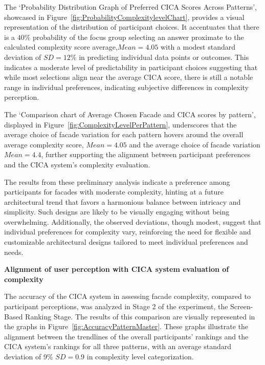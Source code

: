 
The `Probability Distribution Graph of Preferred CICA Scores Across Patterns', showcased in Figure~\ref{fig:ProbabilityComplexitylevelChart}, provides a visual representation of the distribution of participant choices.
It accentuates that there is a \(40\%\) probability of the focus group selecting an answer proximate to the calculated complexity score average,\(Mean = 4.05\) with a modest standard deviation of \(SD = 12\%\) in predicting individual data points or outcomes.
This indicates a moderate level of predictability in participant choices suggesting that while most selections align near the average CICA score, there is still a notable range in individual preferences, indicating subjective differences in complexity perception.


The `Comparison chart of Average Chosen Facade and CICA scores by pattern', displayed in Figure~\ref{fig:ComplexityLevelPerPattern}, underscores that the average choice of facade variation for each pattern hovers around the overall average complexity score, \(Mean = 4.05\) and the average choice of facade variation \(Mean = 4.4\), further supporting the alignment between participant preferences and the CICA system's complexity evaluation.


The results from these preliminary analysis indicate a preference among participants for facades with moderate complexity, hinting at a future architectural trend that favors a harmonious balance between intricacy and simplicity.
Such designs are likely to be visually engaging without being overwhelming.
Additionally, the observed deviations, though modest, suggest that individual preferences for complexity vary, reinforcing the need for flexible and customizable architectural designs tailored to meet individual preferences and needs.

\textbf{Alignment of user perception with CICA system evaluation of complexity}

The accuracy of the CICA system in assessing facade complexity, compared to participant perceptions, was analyzed in Stage 2 of the experiment, the Screen-Based Ranking Stage.
The results of this comparison are visually represented in the graphs in Figure~\ref{fig:AccuracyPatternMaster}.
These graphs illustrate the alignment between the trendlines of the overall participants' rankings and the CICA system's rankings for all three patterns, with an average standard deviation of 9\% \(SD = 0.9\) in complexity level categorization.

